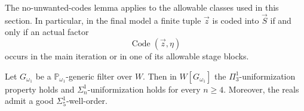 \documentclass[10pt,a4paper]{amsart}
\newcommand{\forceP}{\mathbb{P}}
\begin{document}
\begin{lemma}\label{NoUnwantedCodesSecondMainTheorem}
The no-unwanted-codes lemma applies to the allowable classes used in this section. In particular, in the final model a finite tuple $\vec z$ is coded into $\vec S$ if and only if an actual factor
\[
\operatorname{Code}(\vec z,\eta)
\]
occurs in the main iteration or in one of its allowable stage blocks.
\end{lemma}

\begin{theorem}
Let $G_{\omega_1}$ be a $\forceP_{\omega_1}$-generic filter over $W$. Then in $W[G_{\omega_1}]$ the $\Pi^1_3$-uniformization property holds and $\Sigma^1_n$-uniformization holds for every $n\geq4$. Moreover, the reals admit a good $\Sigma^1_5$-well-order.
\end{theorem}
\end{document}
